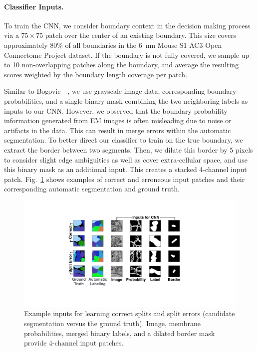\paragraph{Classifier Inputs.} To train the CNN, we consider boundary context in the decision making process via a $75\times75$ patch over the center of an existing boundary. This size covers approximately $80\%$ of all boundaries in the 6~nm Mouse S1 AC3 Open Connectome Project dataset. If the boundary is not fully covered, we sample up to 10 non-overlapping patches along the boundary, and average the resulting scores weighted by the boundary length coverage per patch.

Similar to Bogovic~\etal~\cite{BogovicHJ13}, we use grayscale image data, corresponding boundary probabilities, and a single binary mask combining the two neighboring labels as inputs to our CNN. However, we observed that the boundary probability information generated from EM images is often misleading due to noise or artifacts in the data. This can result in merge errors within the automatic segmentation. To better direct our classifier to train on the true boundary, we extract the border between two segments. Then, we dilate this border by 5 pixels to consider slight edge ambiguities as well as cover extra-cellular space, and use this binary mask as an additional input. This creates a stacked 4-channel input patch. Fig.~\ref{fig:cnn_inputs} shows examples of correct and erroneous input patches and their corresponding automatic segmentation and ground truth.

\begin{figure}[t]
\centering
\includegraphics[width=\linewidth]{gfx/cnn_inputs.pdf}
\caption{Example inputs for learning correct splits and split errors (candidate segmentation versus the ground truth). Image, membrane probabilities, merged binary labels, and a dilated border mask provide 4-channel input patches.}
\label{fig:cnn_inputs}
\vspace{-4mm}
\end{figure}


